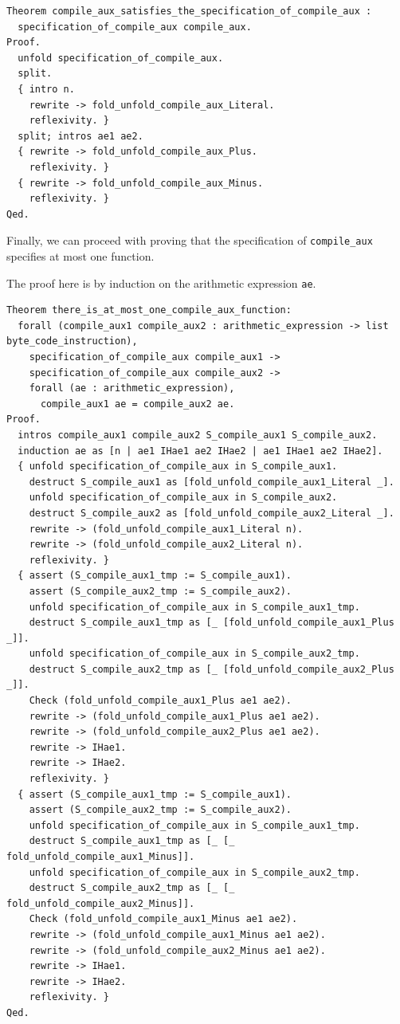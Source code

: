 \documentclass{article}
\begin{document}
\begin{lstlisting}
Theorem compile_aux_satisfies_the_specification_of_compile_aux :
  specification_of_compile_aux compile_aux.
Proof.
  unfold specification_of_compile_aux.
  split.
  { intro n.
    rewrite -> fold_unfold_compile_aux_Literal.
    reflexivity. }
  split; intros ae1 ae2.
  { rewrite -> fold_unfold_compile_aux_Plus.
    reflexivity. }
  { rewrite -> fold_unfold_compile_aux_Minus.
    reflexivity. }
Qed.
\end{lstlisting}

Finally, we can proceed with proving that the specification of \texttt{compile\_aux} specifies at most one function. 

The proof here is by induction on the arithmetic expression \texttt{ae}. 

\begin{lstlisting}
Theorem there_is_at_most_one_compile_aux_function:
  forall (compile_aux1 compile_aux2 : arithmetic_expression -> list byte_code_instruction),
    specification_of_compile_aux compile_aux1 ->
    specification_of_compile_aux compile_aux2 ->
    forall (ae : arithmetic_expression),
      compile_aux1 ae = compile_aux2 ae. 
Proof.
  intros compile_aux1 compile_aux2 S_compile_aux1 S_compile_aux2.
  induction ae as [n | ae1 IHae1 ae2 IHae2 | ae1 IHae1 ae2 IHae2].
  { unfold specification_of_compile_aux in S_compile_aux1.
    destruct S_compile_aux1 as [fold_unfold_compile_aux1_Literal _].
    unfold specification_of_compile_aux in S_compile_aux2.
    destruct S_compile_aux2 as [fold_unfold_compile_aux2_Literal _].
    rewrite -> (fold_unfold_compile_aux1_Literal n).
    rewrite -> (fold_unfold_compile_aux2_Literal n).
    reflexivity. }
  { assert (S_compile_aux1_tmp := S_compile_aux1).
    assert (S_compile_aux2_tmp := S_compile_aux2).
    unfold specification_of_compile_aux in S_compile_aux1_tmp.
    destruct S_compile_aux1_tmp as [_ [fold_unfold_compile_aux1_Plus _]].
    unfold specification_of_compile_aux in S_compile_aux2_tmp.
    destruct S_compile_aux2_tmp as [_ [fold_unfold_compile_aux2_Plus _]].
    Check (fold_unfold_compile_aux1_Plus ae1 ae2).
    rewrite -> (fold_unfold_compile_aux1_Plus ae1 ae2).
    rewrite -> (fold_unfold_compile_aux2_Plus ae1 ae2).
    rewrite -> IHae1.
    rewrite -> IHae2.
    reflexivity. }
  { assert (S_compile_aux1_tmp := S_compile_aux1).
    assert (S_compile_aux2_tmp := S_compile_aux2).
    unfold specification_of_compile_aux in S_compile_aux1_tmp.
    destruct S_compile_aux1_tmp as [_ [_ fold_unfold_compile_aux1_Minus]].
    unfold specification_of_compile_aux in S_compile_aux2_tmp.
    destruct S_compile_aux2_tmp as [_ [_ fold_unfold_compile_aux2_Minus]].
    Check (fold_unfold_compile_aux1_Minus ae1 ae2).
    rewrite -> (fold_unfold_compile_aux1_Minus ae1 ae2).
    rewrite -> (fold_unfold_compile_aux2_Minus ae1 ae2).
    rewrite -> IHae1.
    rewrite -> IHae2.
    reflexivity. }
Qed.
\end{lstlisting}
\end{document}
